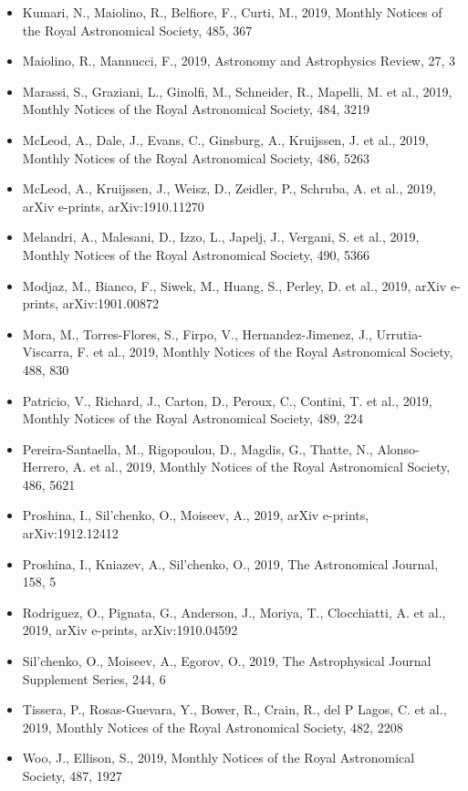 \documentclass{letter}
\begin{document}
\begin{enumerate}
\begin{itemize}
\item Kumari, N., Maiolino, R., Belfiore, F., Curti, M., 2019, Monthly Notices of the Royal Astronomical Society, 485, 367
\item Maiolino, R., Mannucci, F., 2019, Astronomy and Astrophysics Review, 27, 3
\item Marassi, S., Graziani, L., Ginolfi, M., Schneider, R., Mapelli, M. et al., 2019, Monthly Notices of the Royal Astronomical Society, 484, 3219
\item McLeod, A., Dale, J., Evans, C., Ginsburg, A., Kruijssen, J. et al., 2019, Monthly Notices of the Royal Astronomical Society, 486, 5263
\item McLeod, A., Kruijssen, J., Weisz, D., Zeidler, P., Schruba, A. et al., 2019, arXiv e-prints, arXiv:1910.11270
\item Melandri, A., Malesani, D., Izzo, L., Japelj, J., Vergani, S. et al., 2019, Monthly Notices of the Royal Astronomical Society, 490, 5366
\item Modjaz, M., Bianco, F., Siwek, M., Huang, S., Perley, D. et al., 2019, arXiv e-prints, arXiv:1901.00872
\item Mora, M., Torres-Flores, S., Firpo, V., Hernandez-Jimenez, J., Urrutia-Viscarra, F. et al., 2019, Monthly Notices of the Royal Astronomical Society, 488, 830
\item Patricio, V., Richard, J., Carton, D., Peroux, C., Contini, T. et al., 2019, Monthly Notices of the Royal Astronomical Society, 489, 224
\item Pereira-Santaella, M., Rigopoulou, D., Magdis, G., Thatte, N., Alonso-Herrero, A. et al., 2019, Monthly Notices of the Royal Astronomical Society, 486, 5621
\item Proshina, I., Sil'chenko, O., Moiseev, A., 2019, arXiv e-prints, arXiv:1912.12412
\item Proshina, I., Kniazev, A., Sil'chenko, O., 2019, The Astronomical Journal, 158, 5
\item Rodriguez, O., Pignata, G., Anderson, J., Moriya, T., Clocchiatti, A. et al., 2019, arXiv e-prints, arXiv:1910.04592
\item Sil'chenko, O., Moiseev, A., Egorov, O., 2019, The Astrophysical Journal Supplement Series, 244, 6
\item Tissera, P., Rosas-Guevara, Y., Bower, R., Crain, R., del P Lagos, C. et al., 2019, Monthly Notices of the Royal Astronomical Society, 482, 2208
\item Woo, J., Ellison, S., 2019, Monthly Notices of the Royal Astronomical Society, 487, 1927

\end{itemize}
\end{enumerate}
\end{document}
